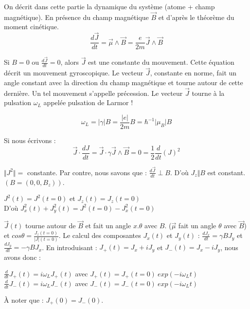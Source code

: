 \documentclass[12pt,a4paper,titlepage]{book}
\begin{document}
On décrit dans cette partie la dynamique du système (atome + champ magnétique). En présence du champ magnétique $\overrightarrow{B}$ et d'après le théorème du moment cinétique.
\begin{equation*}
\frac{d \overrightarrow{J}}{dt} = \overrightarrow{\mu} \wedge \overrightarrow{B} = \frac{e}{2m} \overrightarrow{J} \wedge \overrightarrow{B}
\end{equation*}

Si $B = 0$ ou $\frac{d \overrightarrow{J}}{dt} = 0$, alors $\overrightarrow{J}$ est une constante du mouvement. Cette équation décrit un mouvement gyroscopique. Le vecteur $\overrightarrow{J}$, constante en norme, fait un angle constant avec la direction du champ magnétique et tourne autour de cette dernière. Un tel mouvement s'appelle précession. Le vecteur $\overrightarrow{J}$ tourne à la pulsation $\omega_{L}$ appelée pulsation de Larmor !

\begin{equation*}
\omega_{L} = \vert \gamma \vert B = \frac{\vert e \vert}{2m} B = \hbar^{-1} \vert \mu_{B} \vert B
\end{equation*}

Si nous écrivons :
\begin{equation*}
\overrightarrow{J} \cdot \frac{dJ}{dt} = \overrightarrow{J} \cdot \gamma \overrightarrow{J} \wedge \overrightarrow{B} = 0 = \frac{1}{2} \frac{d}{dt} (J)^2
\end{equation*}

$\Vert J^2 \Vert = $ constante. Par contre, nous savons que : $\frac{d \overrightarrow{J}}{dt} \perp B$. D'où $J_z \Vert B$ est constant. $(B = (0,0,B_z ))$.

\begin{center}
$J^2 (t) = J^2 (t=0)$ et $J_z (t) = J_z (t=0)$\\
D'où $J^2_x (t) + J^2_y (t) = J^2 (t=0) - J_x^2 (t=0)$
\end{center}
$\overrightarrow{J}(t)$ tourne autour de $\overrightarrow{B}$ et fait un angle $x .\theta$ avec $B$. ($\overrightarrow{\mu}$ fait un angle $\theta$ avec $\overrightarrow{B}$) et $cos \theta = \frac{J_z (t=0)}{\vert J \vert (t=0)}$. Le calcul des composantes $J_x (t)$ et $J_y (t)$ : $\frac{dJ_x}{dt} = \gamma B J_y$ et $\frac{dJ_y}{dt} = -\gamma B J_x$. En introduisant : $J_+ (t) = J_x + iJ_y$ et $J_-(t) = J_x -iJ_y$, nous avons donc :
\begin{center}
$\frac{d}{dt} J_+ (t) = i \omega_{L} J_+ (t)$ avec $J_+ (t) = J_+ (t=0) ~exp(-i \omega_{L} t)$\\
$\frac{d}{dt} J_- (t) = i \omega_{L} J_- (t)$ avec $J_- (t) = J_- (t=0) ~exp(-i \omega_{L} t)$
\end{center}
À noter que : $J_+ (0) = J_- (0)$.
\end{document}

